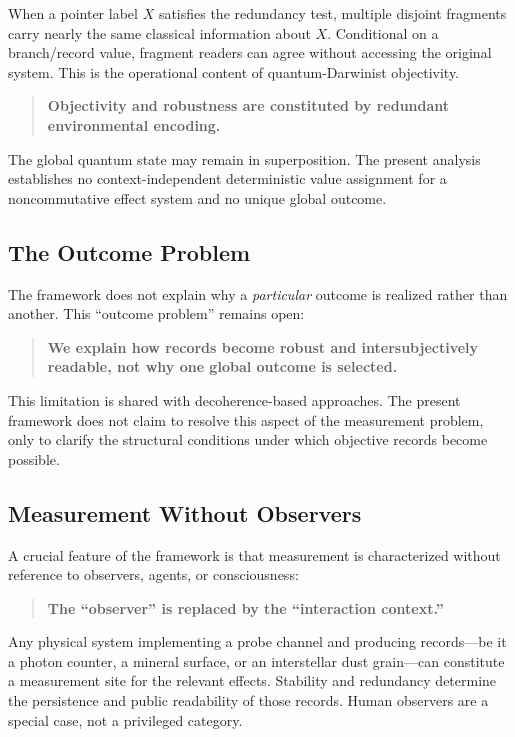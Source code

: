 \documentclass[12pt,a4paper,openany]{book}
\begin{document}
When a pointer label $X$ satisfies the redundancy test, multiple disjoint fragments carry nearly the same classical information about $X$.  Conditional on a branch/record value, fragment readers can agree without accessing the original system.  This is the operational content of quantum-Darwinist objectivity.

\begin{quote}
\textbf{Objectivity and robustness are constituted by redundant environmental encoding.}
\end{quote}

The global quantum state may remain in superposition.  The present analysis establishes no context-independent deterministic value assignment for a noncommutative effect system and no unique global outcome.

\subsection{The Outcome Problem}

The framework does not explain why a \emph{particular} outcome is realized rather than another. This ``outcome problem'' remains open:

\begin{quote}
\textbf{We explain how records become robust and intersubjectively readable, not why one global outcome is selected.}
\end{quote}

This limitation is shared with decoherence-based approaches. The present framework does not claim to resolve this aspect of the measurement problem, only to clarify the structural conditions under which objective records become possible.

\subsection{Measurement Without Observers}

A crucial feature of the framework is that measurement is characterized without reference to observers, agents, or consciousness:

\begin{quote}
\textbf{The ``observer'' is replaced by the ``interaction context.''}
\end{quote}

Any physical system implementing a probe channel and producing records---be it a photon counter, a mineral surface, or an interstellar dust grain---can constitute a measurement site for the relevant effects. Stability and redundancy determine the persistence and public readability of those records. Human observers are a special case, not a privileged category.
\end{document}
